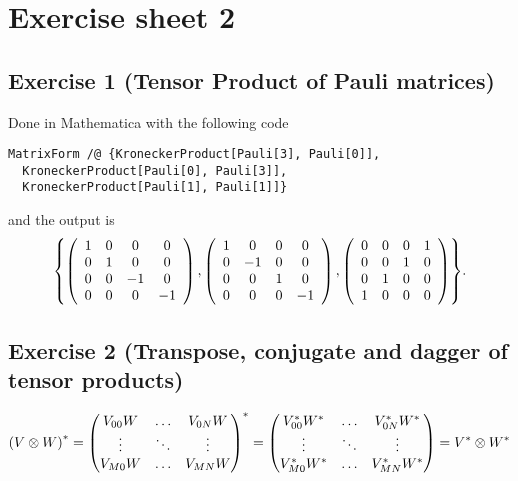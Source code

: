 \section{Exercise sheet 2}
\subsection{Exercise 1 (Tensor Product of Pauli matrices)}\noindent
Done in Mathematica with the following code
\begin{verbatim}
MatrixForm /@ {KroneckerProduct[Pauli[3], Pauli[0]], 
  KroneckerProduct[Pauli[0], Pauli[3]], 
  KroneckerProduct[Pauli[1], Pauli[1]]}
\end{verbatim}
and the output is
\begin{align}
\qty{
\left(
\begin{array}{cccc}
 1 & 0 & 0 & 0 \\
 0 & 1 & 0 & 0 \\
 0 & 0 & -1 & 0 \\
 0 & 0 & 0 & -1 \\
\end{array}
\right),
\left(
\begin{array}{cccc}
 1 & 0 & 0 & 0 \\
 0 & -1 & 0 & 0 \\
 0 & 0 & 1 & 0 \\
 0 & 0 & 0 & -1 \\
\end{array}
\right),
\left(
\begin{array}{cccc}
 0 & 0 & 0 & 1 \\
 0 & 0 & 1 & 0 \\
 0 & 1 & 0 & 0 \\
 1 & 0 & 0 & 0 \\
\end{array}
\right)}.
\end{align}

\subsection{Exercise 2 (Transpose, conjugate and dagger of tensor
products)}
\begin{align}
\qty(V\otimes W)^*=\mqty(V_{00}W&\dots&V_{0N}W\\ 
\vdots&\ddots&\vdots\\ V_{M0}W&\dots&V_{MN}W)^*=
\mqty(V_{00}^*W^*&\dots&V_{0N}^*W^*\\ 
\vdots&\ddots&\vdots\\
V_{M0}^*W^*&\dots&V_{MN}^*W^*)=V^*\otimes W^*
\end{align}

